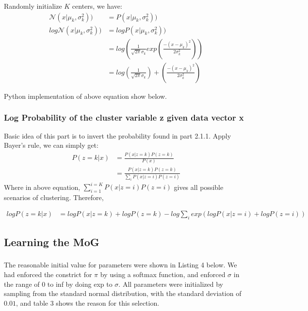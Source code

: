 \documentclass[10pt,letterpaper]{article}
\begin{document}
\qquad Randomly initialize $K$ centers, we have: \begin{align*}
    \mathcal{N}(x|\mu_{k}, \sigma_k^2)) &= P( x|\mu_{k}, \sigma_k^2))\\
   log\mathcal{N}(x|\mu_{k}, \sigma_k^2))&=logP(x|\mu_{k}, \sigma_k^2)) \\
   &=log(\frac{1}{\sqrt{2\pi}\sigma_k}exp(\frac{-(x-\mu_k)^2}{2\sigma_k^2})) \\
   &= log(\frac{1}{\sqrt{2\pi}\sigma_k})+(\frac{-(x-\mu_k)^2}{2\sigma_k^2})
\end{align*}

Python implementation of above equation show below. 

 

\subsubsection{Log Probability of the cluster variable z given data vector x}

\qquad Basic idea of this part is to invert the probability found in part 2.1.1. Apply Bayer's rule, we can simply get: 
\begin{align*}
    P(z = k|x) &= \frac{P(x|z = k)P(z= k)}{P(x)} \\
    &= \frac{P(x|z = k)P(z= k)}{\sum_i P(x|z = i)P(z= i)}
\end{align*}
\qquad Where in above equation, $\sum_{i=1}^{i=K}P(x|z = i)P(z= i)$ gives all possible scenarios of clustering. Therefore, 

\begin{align*}
    logP(z = k|x) &= logP(x|z = k)+logP(z = k) - log\sum_i exp(logP(x|z = i) + logP(z= i))
\end{align*}

 


\subsection{Learning the MoG}
\subsubsection{}
\qquad The reasonable initial value for parameters were shown in Listing 4 below. We had enforced the constrict for $\pi$ by using a softmax function, and enforced $\sigma$ in the range of 0 to inf by doing exp to $\sigma$. All parameters were initialized by sampling from the standard normal distribution, with the standard deviation of $0.01$, and table 3 shows the reason for this selection. \\
\end{document}

